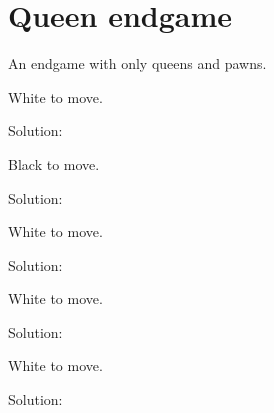 \documentclass{book}
\begin{document}
\section{Queen endgame}
An endgame with only queens and pawns.\begin{multicols}{2} 
\begin{samepage} 
\newgame 


 
\showboard
 
 White to move. 
 
Solution: 
 
\end{samepage}\begin{samepage} 
\newgame 


 
\showboard
 
 Black to move. 
 
Solution: 
 
\end{samepage}\begin{samepage} 
\newgame 


 
\showboard
 
 White to move. 
 
Solution: 
 
\end{samepage}\begin{samepage} 
\newgame 


 
\showboard
 
 White to move. 
 
Solution: 
 
\end{samepage}\begin{samepage} 
\newgame 


 
\showboard
 
 White to move. 
 
Solution: 
 
\end{samepage}\end{multicols} 
\newpage 
\end{document}
